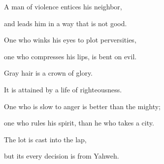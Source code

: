 {\par }{\Q {}A man of violence entices his neighbor,
\par }{\QB and leads him in a way that is not good.
\par }{\Q {}One who winks his eyes to plot perversities,
\par }{\QB one who compresses his lips, is bent on evil.
\par }{\Q {}Gray hair is a crown of glory.
\par }{\QB It is attained by a life of righteousness.
\par }{\Q {}One who is slow to anger is better than the mighty;
\par }{\QB one who rules his spirit, than he who takes a city.
\par }{\Q {}The lot is cast into the lap,
\par }{\QB but its every decision is from Yahweh.

}
